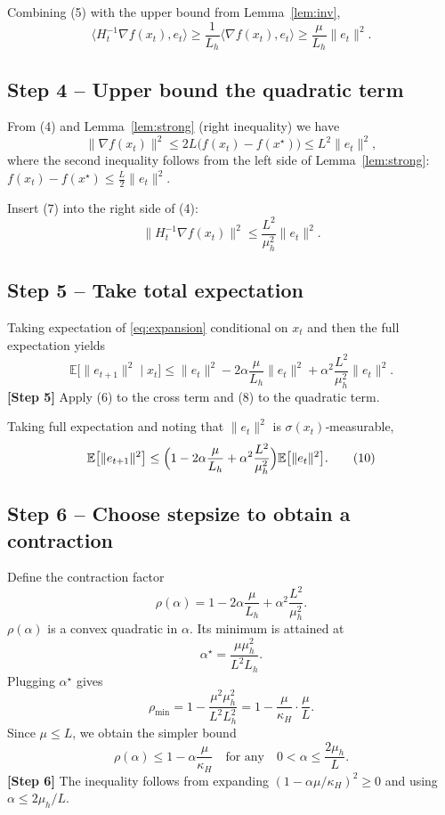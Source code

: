 \documentclass{article}
\newcommand{\E}{\mathbb{E}}
\begin{document}
Combining (5) with the upper bound from Lemma~\ref{lem:inv},
\[
\langle H_{t}^{-1}\nabla f(x_{t}),e_{t}\rangle
\ge \frac{1}{L_{h}}\langle \nabla f(x_{t}),e_{t}\rangle
\ge \frac{\mu}{L_{h}}\|e_{t}\|^{2}.
\tag{6}\label{eq:crosslb}
\]

\subsection*{Step 4 – Upper bound the quadratic term}
From (4) and Lemma~\ref{lem:strong} (right inequality) we have
\[
\| \nabla f(x_{t})\|^{2}
\le 2L\bigl(f(x_{t})-f(x^{\star})\bigr)
\le L^{2}\|e_{t}\|^{2},
\tag{7}
\]
where the second inequality follows from the left side of Lemma~\ref{lem:strong}:
$f(x_{t})-f(x^{\star})\le \frac{L}{2}\|e_{t}\|^{2}$.

Insert (7) into the right side of (4):
\[
\|H_{t}^{-1}\nabla f(x_{t})\|^{2}
\le \frac{L^{2}}{\mu_{h}^{2}}\|e_{t}\|^{2}.
\tag{8}\label{eq:quadub}
\]

\subsection*{Step 5 – Take total expectation}
Taking expectation of \eqref{eq:expansion} conditional on $x_{t}$ and then the full expectation yields
\[
\E\bigl[\|e_{t+1}\|^{2}\mid x_{t}\bigr]
\le \|e_{t}\|^{2}
-2\alpha\frac{\mu}{L_{h}}\|e_{t}\|^{2}
+\alpha^{2}\frac{L^{2}}{\mu_{h}^{2}}\|e_{t}\|^{2}.
\tag{9}
\]
\textbf{[Step 5]} Apply (6) to the cross term and (8) to the quadratic term.

Taking full expectation and noting that $\|e_{t}\|^{2}$ is $\sigma(x_{t})$‑measurable,
\[
\E\bigl[\|e_{t+1}\|^{2}\bigr]
\le \Bigl(1-2\alpha\frac{\mu}{L_{h}}+\alpha^{2}\frac{L^{2}}{\mu_{h}^{2}}\Bigr)
\E\bigl[\|e_{t}\|^{2}\bigr].
\tag{10}
\]

\subsection*{Step 6 – Choose stepsize to obtain a contraction}
Define the contraction factor
\[
\rho(\alpha)=1-2\alpha\frac{\mu}{L_{h}}+\alpha^{2}\frac{L^{2}}{\mu_{h}^{2}}.
\]
$\rho(\alpha)$ is a convex quadratic in $\alpha$. Its minimum is attained at
\[
\alpha^{\star}= \frac{\mu\mu_{h}^{2}}{L^{2}L_{h}}.
\]
Plugging $\alpha^{\star}$ gives
\[
\rho_{\min}=1-\frac{\mu^{2}\mu_{h}^{2}}{L^{2}L_{h}^{2}}
=1-\frac{\mu}{\kappa_{H}}\cdot\frac{\mu}{L}.
\]
Since $\mu\le L$, we obtain the simpler bound
\[
\rho(\alpha)\le 1-\alpha\frac{\mu}{\kappa_{H}}
\quad\text{for any}\quad 
0<\alpha\le\frac{2\mu_{h}}{L}.
\tag{11}\label{eq:rho}
\]
\textbf{[Step 6]} The inequality follows from expanding $(1-\alpha\mu/\kappa_{H})^{2}\ge0$ and using $\alpha\le 2\mu_{h}/L$.
\end{document}

